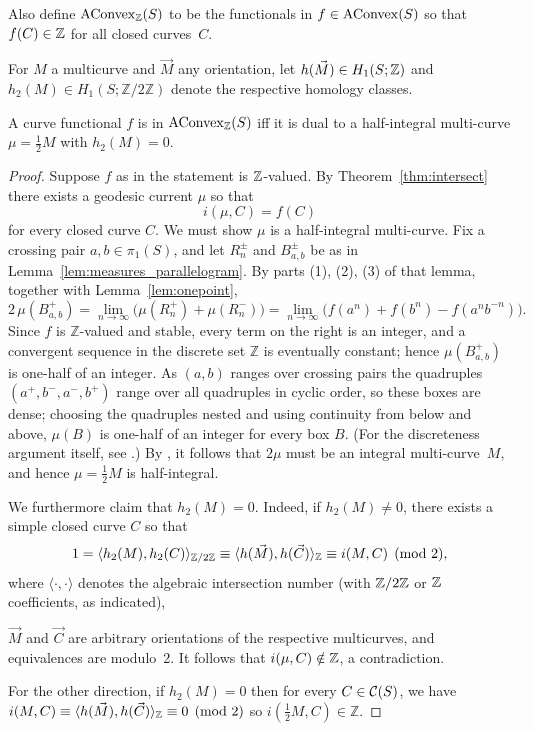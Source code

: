 Also define $\mathrm{AConvex}_{\mathbb{Z}}(S)$ to be the functionals in
$f \in \mathrm{AConvex}(S)$ so that $f(C) \in \mathbb{Z}$ for all closed curves~$C$.

For $M$ a multicurve and $\vec M$ any orientation, let $h(\vec M) \in
H_1(S; \mathbb{Z})$ and
$h_2(M) \in H_1(S;\mathbb{Z}/2\mathbb{Z})$
denote the respective homology classes.
\begin{corollary}
A curve functional $f$ is in $\mathrm{AConvex}_{\mathbb{Z}}(S)$ iff it is dual to a
half-integral multi-curve $\mu=\frac{1}{2}M$ with $h_2(M) = 0$.
\label{cor:int_multicurve}
\end{corollary}
\begin{proof}
  Suppose $f$ as in the statement is $\mathbb{Z}$-valued.
By Theorem~\ref{thm:intersect} there exists a geodesic current $\mu$ so that
\[
i(\mu, C) = f(C)
\]
for every closed curve $C$.
We must show $\mu$ is a half-integral multi-curve. Fix a crossing pair $a,b\in\pi_1(S)$, and let $R_n^\pm$ and $B_{a,b}^\pm$
be as in Lemma~\ref{lem:measures_parallelogram}. By parts (1), (2), (3) of
that lemma, together with Lemma~\ref{lem:onepoint},
\[
2\,\mu(B_{a,b}^+)
= \lim_{n\to\infty}\bigl(\mu(R_n^+)+\mu(R_n^-)\bigr)
= \lim_{n\to\infty}\bigl(f(a^n)+f(b^n)-f(a^nb^{-n})\bigr).
\]
Since $f$ is $\mathbb{Z}$-valued and stable, every term on the right is
an integer, and a convergent sequence in the discrete set $\mathbb{Z}$ is
eventually constant; hence $\mu(B_{a,b}^+)$ is one-half of an integer. As
$(a,b)$ ranges over crossing pairs the quadruples $(a^+,b^-,a^-,b^+)$
range over all quadruples in cyclic order, so these boxes are dense;
choosing the quadruples nested and using continuity from below and above,
$\mu(B)$ is one-half of an integer for every box $B$. (For the
discreteness argument itself, see
\cite[Appendix~A]{JMG26:CoarseNegativeCurvature}.)
By \cite[Proposition~4.12]{BIPP24:PositiveCrossratios}, it follows
that $2\mu$ must be an integral multi-curve~$M$, and hence
$\mu=\frac{1}{2} M$ is half-integral.

We furthermore claim that $h_2(M)=0$.
Indeed, if $h_2(M) \ne 0$, there exists a simple closed curve $C$ so
that
\[
  1 = \langle h_2(M), h_2(C) \rangle_{\mathbb{Z}/2\mathbb{Z}}
  \equiv \langle h(\vec M), h(\vec C)\rangle_{\mathbb{Z}}
  \equiv i(M, C) \pmod 2,
\]
where $\langle \cdot, \cdot \rangle$ denotes the algebraic
intersection number (with $\mathbb{Z}/2\mathbb{Z}$ or $\mathbb{Z}$ coefficients, as
indicated),

$\vec M$ and $\vec C$ are arbitrary orientations of the respective multicurves,
and equivalences are modulo~2. It follows that $i(\mu,C)
\notin \mathbb{Z}$, a contradiction.

For the other direction, if $h_2(M) = 0$ then
for every $C \in \mathcal{C}(S)$, we have
$i(M,C) \equiv \langle
h(\vec M), h(\vec C)\rangle_{\mathbb{Z}} \equiv 0 \pmod 2$ so 
$i(\frac12 M, C) \in \mathbb{Z}$.
\end{proof}
